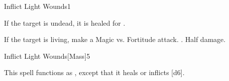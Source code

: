 \begin{spellsection}{Inflict Light Wounds}{1}
\begin{spellheader}
\end{spellheader}
\begin{spellcontent}
    \begin{spelltargetinginfo}
    \end{spelltargetinginfo}
    \begin{spelleffects}
        \spelleffect If the target is undead, it is healed for .
        \begin{spellattacktriggered}{If the target is living, make a Magic vs. Fortitude attack.}
            \spellsuccess {}.
            \spellfailure Half damage.
        \end{spellattacktriggered}
    \end{spelleffects}
\end{spellcontent}
\begin{spellfooter}
\end{spellfooter}
\end{spellsection}

\begin{spellsection}{Inflict Light Wounds}[Mass]{5}
\begin{spellheader}
\end{spellheader}
\begin{spellcontent}
    \begin{spelltargetinginfo}
    \end{spelltargetinginfo}
    \begin{spelleffects}
        \spellspecial This spell functions as , except that it heals or inflicts [d6].
    \end{spelleffects}
\end{spellcontent}
\begin{spellfooter}
\end{spellfooter}
\end{spellsection}

